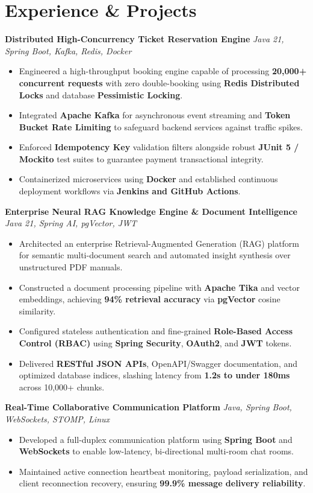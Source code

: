 \documentclass[letterpaper,10pt]{article}
\newcommand{\resumeItem}[1]{
  \item\small{
    {#1 \vspace{-2.0pt}}
  }
}
\begin{document}
\section{Experience \& Projects}

\vspace{1pt}
\noindent \textbf{Distributed High-Concurrency Ticket Reservation Engine} \hfill \textit{Java 21, Spring Boot, Kafka, Redis, Docker}
\begin{itemize}[leftmargin=0.2in, itemsep=1.5pt, topsep=2pt]
    \resumeItem{Engineered a high-throughput booking engine capable of processing \textbf{20,000+ concurrent requests} with zero double-booking using \textbf{Redis Distributed Locks} and database \textbf{Pessimistic Locking}.}
    \resumeItem{Integrated \textbf{Apache Kafka} for asynchronous event streaming and \textbf{Token Bucket Rate Limiting} to safeguard backend services against traffic spikes.}
    \resumeItem{Enforced \textbf{Idempotency Key} validation filters alongside robust \textbf{JUnit 5 / Mockito} test suites to guarantee payment transactional integrity.}
    \resumeItem{Containerized microservices using \textbf{Docker} and established continuous deployment workflows via \textbf{Jenkins and GitHub Actions}.}
\end{itemize}

\vspace{1pt}
\noindent \textbf{Enterprise Neural RAG Knowledge Engine \& Document Intelligence} \hfill \textit{Java 21, Spring AI, pgVector, JWT}
\begin{itemize}[leftmargin=0.2in, itemsep=1.5pt, topsep=2pt]
    \resumeItem{Architected an enterprise Retrieval-Augmented Generation (RAG) platform for semantic multi-document search and automated insight synthesis over unstructured PDF manuals.}
    \resumeItem{Constructed a document processing pipeline with \textbf{Apache Tika} and vector embeddings, achieving \textbf{94\% retrieval accuracy} via \textbf{pgVector} cosine similarity.}
    \resumeItem{Configured stateless authentication and fine-grained \textbf{Role-Based Access Control (RBAC)} using \textbf{Spring Security}, \textbf{OAuth2}, and \textbf{JWT} tokens.}
    \resumeItem{Delivered \textbf{RESTful JSON APIs}, OpenAPI/Swagger documentation, and optimized database indices, slashing latency from \textbf{1.2s to under 180ms} across 10,000+ chunks.}
\end{itemize}

\vspace{1pt}
\noindent \textbf{Real-Time Collaborative Communication Platform} \hfill \textit{Java, Spring Boot, WebSockets, STOMP, Linux}
\begin{itemize}[leftmargin=0.2in, itemsep=1.5pt, topsep=2pt]
    \resumeItem{Developed a full-duplex communication platform using \textbf{Spring Boot} and \textbf{WebSockets} to enable low-latency, bi-directional multi-room chat rooms.}
    \resumeItem{Maintained active connection heartbeat monitoring, payload serialization, and client reconnection recovery, ensuring \textbf{99.9\% message delivery reliability}.}
\end{itemize}
\vspace{-6pt}
\end{document}
